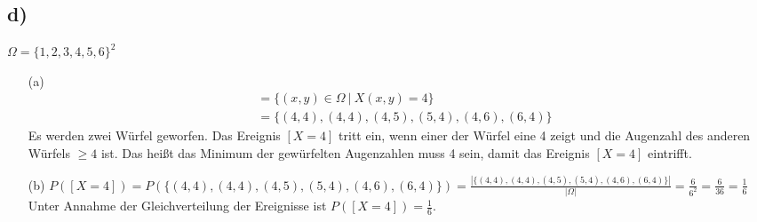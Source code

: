 \documentclass[a4paper]{scrartcl}
\begin{document}
\subsection*{d)}
$\Omega = \{1, 2, 3, 4,5 ,6\}^2$
\begin{itemize}
\item[(a)]
\begin{align*}
[X=4]&=\{(x,y) \in \Omega \ | \ X(x,y)=4\}\\
&=\{(4,4),(4,4),(4,5),(5,4),(4,6),(6,4)\}
\end{align*}
Es werden zwei Würfel geworfen. Das Ereignis $[X=4]$ tritt ein, wenn einer der Würfel eine 4 zeigt und die Augenzahl des anderen Würfels $\ge 4$ ist. Das heißt das Minimum der gewürfelten Augenzahlen muss 4 sein, damit das Ereignis $[X=4]$ eintrifft.
\item[(b)]
$P([X=4])=P(\{(4,4),(4,4),(4,5),(5,4),(4,6),(6,4)\})=\frac{|\{(4,4),(4,4),(4,5),(5,4),(4,6),(6,4)\}|}{|\Omega|}=\frac{6}{6^2}=\frac{6}{36}=\frac{1}{6}$\\
Unter Annahme der Gleichverteilung der Ereignisse ist $P([X=4])=\frac{1}{6}$.
\end{itemize}
\end{document}
